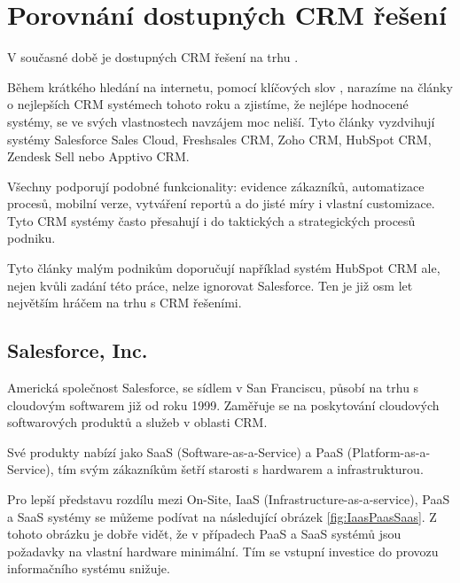 \section{Porovnání dostupných CRM řešení} 
V současné době je dostupných CRM řešení na trhu . 

Během krátkého hledání na internetu, pomocí klíčových slov , narazíme na články \cite{PCMagCRM2022}\cite{TechRadarCRM2022} o nejlepších CRM systémech tohoto roku a zjistíme, že nejlépe hodnocené systémy, se ve svých vlastnostech navzájem moc neliší. Tyto články vyzdvihují systémy Salesforce Sales Cloud, Freshsales CRM, Zoho CRM, HubSpot CRM, Zendesk Sell nebo Apptivo CRM. 

Všechny podporují podobné funkcionality: evidence zákazníků, automatizace procesů, mobilní verze, vytváření reportů a do jisté míry i vlastní customizace. Tyto CRM systémy často přesahují i do taktických a strategických procesů podniku.

Tyto články malým podnikům doporučují například systém HubSpot CRM \cite{PCMagCRM2022} ale, nejen kvůli zadání této práce, nelze ignorovat Salesforce. Ten je již osm let největším hráčem na trhu s CRM řešeními. \cite{SalesforceCRMmarketShare}
\subsection{Salesforce, Inc.} \label{SalesforceCRM}
Americká společnost Salesforce, se sídlem v San Franciscu, působí na trhu s cloudovým softwarem již od roku 1999. Zaměřuje se na poskytování cloudových softwarových produktů a služeb v oblasti CRM. \cite{SalesforceHistory}

Své produkty nabízí jako SaaS (Software-as-a-Service) a PaaS (Platform-as-a-Service), tím svým zákazníkům šetří starosti s hardwarem a infrastrukturou.

Pro lepší představu rozdílu mezi On-Site, IaaS (Infrastructure-as-a-service), PaaS a SaaS systémy se můžeme podívat na následující obrázek \ref{fig:IaasPaasSaas}.
Z tohoto obrázku je dobře vidět, že v případech PaaS a SaaS systémů jsou požadavky na vlastní hardware minimální. Tím se vstupní investice do provozu informačního systému snižuje.


